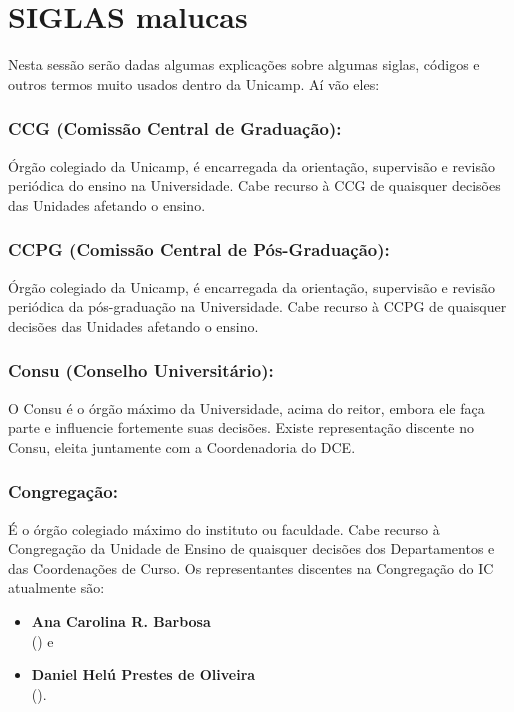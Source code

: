 
\section{SIGLAS malucas}

Nesta sessão serão dadas algumas explicações sobre algumas siglas, códigos e
outros termos muito usados dentro da Unicamp. Aí vão eles:

\subsubsection{CCG (Comissão Central de Graduação):} Órgão colegiado da
Unicamp, é encarregada da orientação, supervisão e revisão periódica do ensino
na Universidade. Cabe recurso à CCG de quaisquer decisões das Unidades afetando
o ensino.

\subsubsection{CCPG (Comissão Central de Pós-Graduação):} Órgão colegiado da
Unicamp, é encarregada da orientação, supervisão e revisão periódica da
pós-graduação na Universidade. Cabe recurso à CCPG de quaisquer decisões das
Unidades afetando o ensino.

\subsubsection{Consu (Conselho Universitário):} O Consu é o órgão máximo da
Universidade, acima do reitor, embora ele faça parte e influencie fortemente
suas decisões.  Existe representação discente no Consu, eleita juntamente com a
Coordenadoria do DCE.

\subsubsection{Congregação:} É o órgão colegiado máximo do instituto ou
faculdade.  Cabe recurso à Congregação da Unidade de Ensino de quaisquer
decisões dos Departamentos e das Coordenações de Curso. Os representantes
discentes na Congregação do IC atualmente são:

\begin{itemize}[noitemsep]
\item \textbf{Ana Carolina R. Barbosa}
  \\() e
\item \textbf{Daniel Helú Prestes de Oliveira}
  \\().
\end{itemize}

